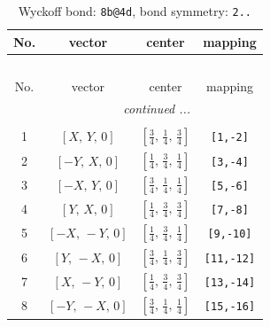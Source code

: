 \documentclass[fleqn,8pt]{jsarticle}
\begin{document}
\begin{longtable}{cccc}
\caption{Wyckoff bond: {\tt 8b@4d}, bond symmetry: {\tt 2..}}
 \\
 \hline \hline
No. & vector & center & mapping \\ \hline \endfirsthead

\multicolumn{3}{l}{\tablename\ \thetable{}} \\
 \hline \hline
No. & vector & center & mapping \\ \hline \endhead

 \hline \hline
\multicolumn{3}{r}{\footnotesize\it continued ...} \\ \endfoot

 \hline \hline
\multicolumn{3}{r}{} \\ \endlastfoot

1 & $\left[ X,\, Y,\, 0 \right]$ & $\left[ \frac{3}{4},\, \frac{1}{4},\, \frac{3}{4} \right]$ & {\tt [1,-2]} \\ \hline
2 & $\left[ - Y,\, X,\, 0 \right]$ & $\left[ \frac{1}{4},\, \frac{3}{4},\, \frac{1}{4} \right]$ & {\tt [3,-4]} \\ \hline
3 & $\left[ - X,\, Y,\, 0 \right]$ & $\left[ \frac{3}{4},\, \frac{1}{4},\, \frac{1}{4} \right]$ & {\tt [5,-6]} \\ \hline
4 & $\left[ Y,\, X,\, 0 \right]$ & $\left[ \frac{1}{4},\, \frac{3}{4},\, \frac{3}{4} \right]$ & {\tt [7,-8]} \\ \hline
5 & $\left[ - X,\, - Y,\, 0 \right]$ & $\left[ \frac{1}{4},\, \frac{3}{4},\, \frac{1}{4} \right]$ & {\tt [9,-10]} \\ \hline
6 & $\left[ Y,\, - X,\, 0 \right]$ & $\left[ \frac{3}{4},\, \frac{1}{4},\, \frac{3}{4} \right]$ & {\tt [11,-12]} \\ \hline
7 & $\left[ X,\, - Y,\, 0 \right]$ & $\left[ \frac{1}{4},\, \frac{3}{4},\, \frac{3}{4} \right]$ & {\tt [13,-14]} \\ \hline
8 & $\left[ - Y,\, - X,\, 0 \right]$ & $\left[ \frac{3}{4},\, \frac{1}{4},\, \frac{1}{4} \right]$ & {\tt [15,-16]} \\
\end{longtable}
\renewcommand{\arraystretch}{1.2}
\end{document}

